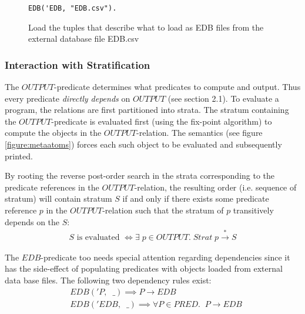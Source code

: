 \vspace*{-\baselineskip}
\begin{figure}[!ht]
\begin{minipage}{4cm}
\begin{verbatim}
EDB('EDB, "EDB.csv"). 
\end{verbatim}
\end{minipage}
\vspace*{-10pt}
\caption{Load the tuples that describe what to load as EDB files from the external database file EDB.csv}
\label{figure:edb}
\end{figure}
\vspace*{-7pt}
\subsubsection{Interaction with Stratification}
The $OUTPUT$-predicate determines what predicates to compute and output. Thus every predicate \textit{directly depends} on $OUTPUT$ (see section 2.1). To evaluate a \datalogM program, the relations are first partitioned into strata. The stratum containing the $OUTPUT$-predicate is evaluated first (using the fix-point algorithm) to compute the objects in the $OUTPUT$-relation. The semantics (see figure \ref{figure:metaatoms}) forces each such object to be evaluated and subsequently printed. 

By rooting the reverse post-order search in the strata corresponding to the predicate references in the $OUTPUT$-relation, the resulting order (i.e. sequence of stratum) will contain stratum $S$ if and only if there exists some predicate reference $p$ in the $OUTPUT$-relation such that the stratum of $p$ transitively depends on the $S$:
\begin{align*}
S \text{ is evaluated } \iff \exists\;p \in OUTPUT.\;Strat\;p \xrightarrow{*} S
\end{align*}

The $EDB$-predicate too needs special attention regarding dependencies since it has the side-effect of populating predicates with objects loaded from external data base files. The following two dependency rules exist:
\begin{align*}
&EDB('P,\;\; \_) \implies P \xrightarrow{} EDB\\
&EDB('EDB,\;\; \_) \implies \forall P \in PRED. \;\;P \xrightarrow{} EDB
\end{align*}

